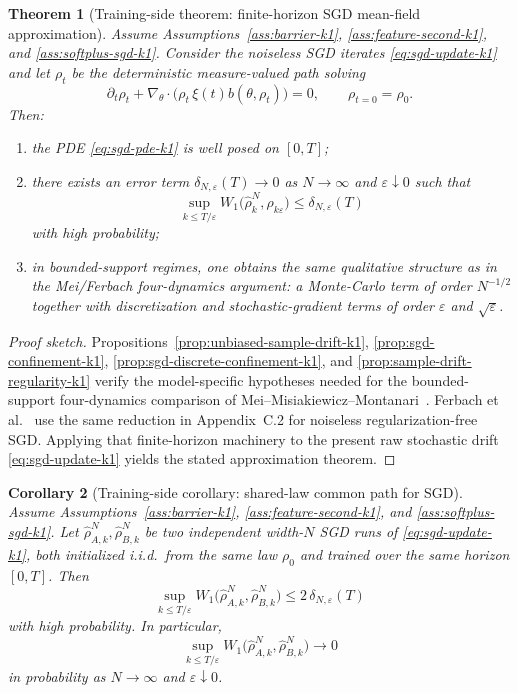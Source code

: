 \documentclass[11pt]{article}
\newtheorem{theorem}{Theorem}
\newtheorem{corollary}[theorem]{Corollary}
\theoremstyle{definition}
\begin{document}
\begin{theorem}[Training-side theorem: finite-horizon SGD mean-field approximation]
\label{thm:sgd-mean-field-k1}
Assume Assumptions~\ref{ass:barrier-k1}, \ref{ass:feature-second-k1}, and
\ref{ass:softplus-sgd-k1}. Consider the noiseless SGD iterates
\eqref{eq:sgd-update-k1} and let $\rho_t$ be the deterministic measure-valued
path solving
\begin{equation}
  \partial_t \rho_t
  +
  \nabla_\theta\cdot\bigl(\rho_t\,\xi(t)b(\theta,\rho_t)\bigr)
  =
  0,
  \qquad
  \rho_{t=0}=\rho_0.
  \label{eq:sgd-pde-k1}
\end{equation}
Then:
\begin{enumerate}[label=(\roman*)]
  \item the PDE \eqref{eq:sgd-pde-k1} is well posed on $[0,T]$;
  \item there exists an error term $\delta_{N,\varepsilon}(T)\to 0$ as
  $N\to\infty$ and $\varepsilon\downarrow 0$ such that
  \[
    \sup_{k\le T/\varepsilon}
    W_1\!\bigl(\hat\rho_k^N,\rho_{k\varepsilon}\bigr)
    \le
    \delta_{N,\varepsilon}(T)
  \]
  with high probability;
  \item in bounded-support regimes, one obtains the same qualitative structure
  as in the Mei/Ferbach four-dynamics argument: a Monte-Carlo term of order
  $N^{-1/2}$ together with discretization and stochastic-gradient terms of
  order $\varepsilon$ and $\sqrt{\varepsilon}$.
\end{enumerate}
\end{theorem}

\begin{proof}[Proof sketch]
Propositions~\ref{prop:unbiased-sample-drift-k1},
\ref{prop:sgd-confinement-k1}, \ref{prop:sgd-discrete-confinement-k1}, and
\ref{prop:sample-drift-regularity-k1} verify the model-specific hypotheses
needed for the bounded-support four-dynamics comparison of
Mei--Misiakiewicz--Montanari~\cite{MeiMisiakiewiczMontanari2019}. Ferbach et
al.~\cite{Ferbach2024} use the same reduction in Appendix~C.2 for noiseless
regularization-free SGD. Applying that finite-horizon machinery to the present
raw stochastic drift \eqref{eq:sgd-update-k1} yields the stated approximation
theorem.
\end{proof}

\begin{corollary}[Training-side corollary: shared-law common path for SGD]
\label{cor:sgd-common-path-k1}
Assume Assumptions~\ref{ass:barrier-k1}, \ref{ass:feature-second-k1}, and
\ref{ass:softplus-sgd-k1}. Let $\hat\rho_{A,k}^N,\hat\rho_{B,k}^N$ be two
independent width-$N$ SGD runs of \eqref{eq:sgd-update-k1}, both initialized
i.i.d.\ from the same law $\rho_0$ and trained over the same horizon $[0,T]$.
Then
\[
  \sup_{k\le T/\varepsilon}
  W_1\!\bigl(\hat\rho_{A,k}^N,\hat\rho_{B,k}^N\bigr)
  \le
  2\,\delta_{N,\varepsilon}(T)
\]
with high probability. In particular,
\[
  \sup_{k\le T/\varepsilon}
  W_1\!\bigl(\hat\rho_{A,k}^N,\hat\rho_{B,k}^N\bigr)\to 0
\]
in probability as $N\to\infty$ and $\varepsilon\downarrow 0$.
\end{corollary}
\end{document}
